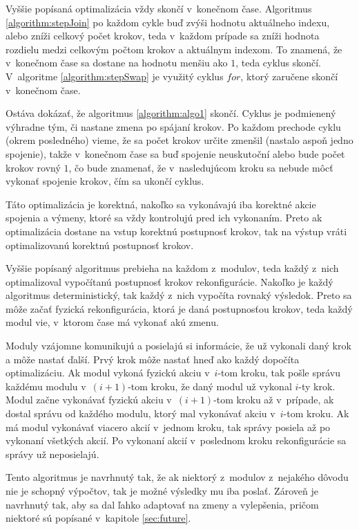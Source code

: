 \documentclass[
  printed, %
  oneside, %
  notable,   %
  nolof,     %
  nolot,     %
]{fithesis3}
\begin{document}
Vyššie popísaná optimalizácia vždy skončí v~konečnom čase. Algoritmus \ref{algorithm:stepJoin} po každom cykle buď zvýši hodnotu aktuálneho indexu, alebo zníži celkový počet krokov, teda v~každom prípade sa zníži hodnota rozdielu medzi celkovým počtom krokov a aktuálnym indexom. To znamená, že v~konečnom čase sa dostane na hodnotu menšiu ako $1$, teda cyklus skončí. V~algoritme \ref{algorithm:stepSwap} je využitý cyklus $for$, ktorý zaručene skončí v~konečnom čase. 

Ostáva dokázať, že algoritmus \ref{algorithm:algo1} skončí. Cyklus je podmienený výhradne tým, či nastane zmena po spájaní krokov. Po každom prechode cyklu (okrem posledného) vieme, že sa počet krokov určite zmenšil (nastalo aspoň jedno spojenie), takže v~konečnom čase sa buď spojenie neuskutoční alebo bude počet krokov rovný $1$, čo bude znamenať, že v~nasledujúcom kroku sa nebude môcť vykonať spojenie krokov, čím sa ukončí cyklus. 

Táto optimalizácia je korektná, nakoľko sa vykonávajú iba korektné akcie spojenia a výmeny, ktoré sa vždy kontrolujú pred ich vykonaním. Preto ak optimalizácia dostane na vstup korektnú postupnosť krokov, tak na výstup vráti optimalizovanú korektnú postupnosť krokov. 

Vyššie popísaný algoritmus prebieha na každom z~modulov, teda každý z~nich optimalizoval vypočítanú postupnosť krokov rekonfigurácie. Nakoľko je každý algoritmus deterministický, tak každý z~nich vypočíta rovnaký výsledok. Preto sa môže začať fyzická rekonfigurácia, ktorá je daná postupnosťou krokov, teda každý modul vie, v~ktorom čase má vykonať akú zmenu. 

Moduly vzájomne komunikujú a posielajú si informácie, že už vykonali daný krok a môže nastať ďalší. Prvý krok môže nastať hneď ako každý dopočíta optimalizáciu. Ak modul vykoná fyzickú akciu v~$i$-tom kroku, tak pošle správu každému modulu v~$(i + 1)$-tom kroku, že daný modul už vykonal $i$-ty krok. Modul začne vykonávať fyzickú akciu v~$(i + 1)$-tom kroku až v~prípade, ak dostal správu od každého modulu, ktorý mal vykonávať akciu v~$i$-tom kroku. Ak má modul vykonávať viacero akcií v~jednom kroku, tak správy posiela až po vykonaní všetkých akcií. Po vykonaní akcií v~poslednom kroku rekonfigurácie sa správy už neposielajú. 

Tento algoritmus je navrhnutý tak, že ak niektorý z~modulov z~nejakého dôvodu nie je schopný výpočtov, tak je možné výsledky mu iba poslať. Zároveň je navrhnutý tak, aby sa dal ľahko adaptovať na zmeny a vylepšenia, pričom niektoré sú popísané v~kapitole \ref{sec:future}.  
\end{document}
